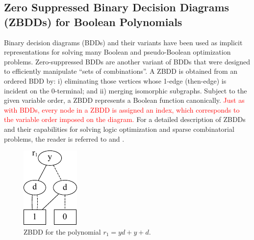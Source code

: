 \subsection{Zero Suppressed Binary Decision Diagrams (ZBDDs) for
  Boolean Polynomials}


Binary decision diagrams (BDDs) \cite{BRYA86} and
their variants 
have been used as implicit representations for solving many
Boolean and pseudo-Boolean optimization problems. Zero-suppressed BDDs
\cite{zbdd} are another variant of BDDs that were designed to
efficiently manipulate ``sets of combinations''. A ZBDD is obtained
from an ordered BDD by: i) eliminating those vertices whose 1-edge
(then-edge) is incident on the 0-terminal; and ii) merging isomorphic
subgraphs. Subject to the given variable order, a ZBDD represents a 
Boolean function canonically. \textcolor{red}{Just as with BDDs, every node in a ZBDD
is assigned an index, which corresponds to the variable order imposed
on the diagram.} For a detailed description of ZBDDs and
their capabilities for solving logic optimization and sparse
combinatorial problems, the reader is referred to \cite{zbdd} and
\cite{zbdd_unate}. 

\begin{figure}[hbt]
\centering
\includegraphics[scale=1]{Preliminaries-Theory/r1_clean.pdf}
\caption{ZBDD for the polynomial $r_1 = yd + y + d$.}
\label{r1}
\end{figure}


